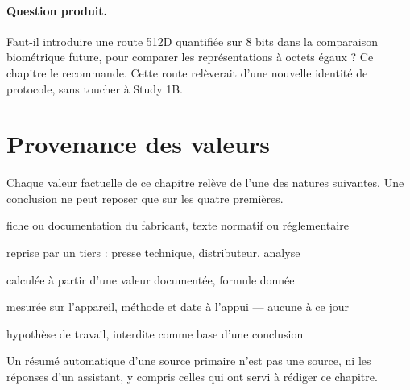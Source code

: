 \documentclass[11pt,a4paper]{article}
\begin{document}
\paragraph{Question produit.} Faut-il introduire une route 512D quantifiée sur 8 bits
dans la comparaison biométrique future, pour comparer les représentations à octets
égaux ? Ce chapitre le recommande. Cette route relèverait d'une nouvelle identité de
protocole, sans toucher à Study 1B.

\section{Provenance des valeurs}\label{sec:provenance}

Chaque valeur factuelle de ce chapitre relève de l'une des natures suivantes. Une
conclusion ne peut reposer que sur les quatre premières.

\begin{description}[style=nextline,leftmargin=2.2cm,font=\sffamily\small\bfseries]
\item[primaire] fiche ou documentation du fabricant, texte normatif ou réglementaire
\item[secondaire] reprise par un tiers : presse technique, distributeur, analyse
\item[dérivée] calculée à partir d'une valeur documentée, formule donnée
\item[mesurée] mesurée sur l'appareil, méthode et date à l'appui — aucune à ce jour
\item[supposée] hypothèse de travail, interdite comme base d'une conclusion
\end{description}

Un résumé automatique d'une source primaire n'est pas une source, ni les réponses d'un
assistant, y compris celles qui ont servi à rédiger ce chapitre.
\end{document}
